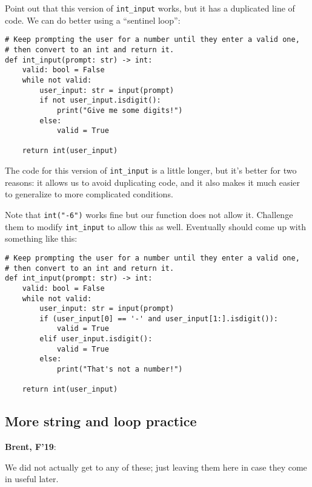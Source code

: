 \documentclass{article}
\newenvironment{reflect}[1]
{
  \noindent
  \begin{lrbox}{\reflectbox}
    \begin{minipage}[t]{\textwidth}
      \textbf{#1}:
}{
    \end{minipage}
  \end{lrbox}
  \fbox{\usebox{\reflectbox}}
}
\begin{document}
Point out that this version of \texttt{int\_input} works, but it has a
duplicated line of code. We can do better using a ``sentinel loop'':

\begin{verbatim}
# Keep prompting the user for a number until they enter a valid one,
# then convert to an int and return it.
def int_input(prompt: str) -> int:
    valid: bool = False
    while not valid:
        user_input: str = input(prompt)
        if not user_input.isdigit():
            print("Give me some digits!")
        else:
            valid = True

    return int(user_input)
\end{verbatim}

The code for this version of \texttt{int\_input} is a little longer,
but it's better for two reasons: it allows us to avoid duplicating
code, and it also makes it much easier to generalize to more
complicated conditions.

Note that \texttt{int("-6")} works fine but our function does not
allow it.  Challenge them to modify \texttt{int\_input} to allow this
as well.  Eventually should come up with something like this:

\begin{verbatim}
# Keep prompting the user for a number until they enter a valid one,
# then convert to an int and return it.
def int_input(prompt: str) -> int:
    valid: bool = False
    while not valid:
        user_input: str = input(prompt)
        if (user_input[0] == '-' and user_input[1:].isdigit()):
            valid = True
        elif user_input.isdigit():
            valid = True
        else:
            print("That's not a number!")

    return int(user_input)
\end{verbatim}



\subsection*{More string and loop practice}

\begin{reflect}{Brent, F'19}
  We did not actually get to any of these; just leaving them here in
  case they come in useful later.
\end{reflect}
\end{document}

